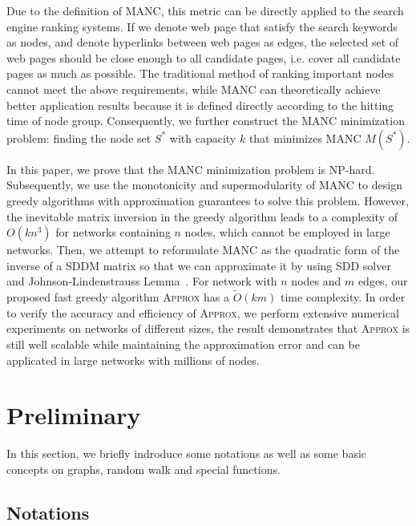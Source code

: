 \documentclass[sigconf]{acmart}
\begin{document}
Due to the definition of MANC, this metric can be directly applied to the search engine ranking systems.
If we denote web page that satisfy the search keywords as nodes, and denote hyperlinks between web pages as edges, the selected set of web pages should be close enough to all candidate pages, i.e. cover all candidate pages as much as possible.
The traditional method of ranking important nodes cannot meet the above requirements, while MANC can theoretically achieve better application results because it is defined directly according to the hitting time of node group.
Consequently, we further construct the MANC minimization problem: finding the node set \(S^*\) with capacity \(k\) that minimizes MANC \(M(S^*)\).

In this paper, we prove that the MANC minimization problem is NP-hard.
Subsequently, we use the monotonicity and supermodularity of MANC to design greedy algorithms with approximation guarantees to solve this problem.
However, the inevitable matrix inversion in the greedy algorithm leads to a complexity of \(O(kn^3)\) for networks containing \(n\) nodes, which cannot be employed in large networks.
Then, we attempt to reformulate MANC as the quadratic form of the inverse of a SDDM matrix so that we can approximate it by using SDD solver~\cite{CoKyMiPaJaPeRaXu14,SpTe14} and Johnson-Lindenstrauss Lemma~\cite{JoLi84}.
For network with \(n\) nodes and \(m\) edges, our proposed fast greedy algorithm \textsc{Approx} has a \(\tilde{O}(km)\) time complexity.
In order to verify the accuracy and efficiency of \textsc{Approx}, we perform extensive numerical experiments on networks of different sizes, the result demonstrates that \textsc{Approx} is still well scalable while maintaining the approximation error and can be applicated in large networks with millions of nodes.

\section{Preliminary}

In this section, we briefly indroduce some notations as well as some basic concepts on graphs, random walk and special functions.

\subsection{Notations}
\end{document}
